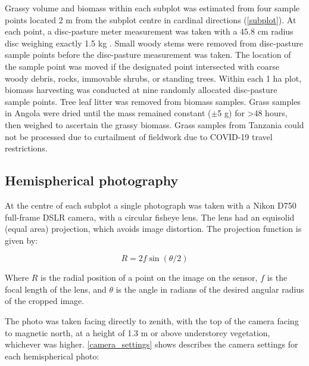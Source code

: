 \documentclass[11pt,a4paper]{article}
\begin{document}
Grassy volume and biomass within each subplot was estimated from four sample points located 2 m from the subplot centre in cardinal directions (\autoref{subplot}). At each point, a disc-pasture meter measurement was taken with a 45.8 cm radius disc weighing exactly 1.5 kg \citep{Bransby1977}. Small woody stems were removed from disc-pasture sample points before the disc-pasture measurement was taken. The location of the sample point was moved if the designated point intersected with coarse woody debris, rocks, immovable shrubs, or standing trees. Within each 1 ha plot, biomass harvesting was conducted at nine randomly allocated disc-pasture sample points. Tree leaf litter was removed from biomass samples. Grass samples in Angola were dried until the mass remained constant ($\pm$5 g) for >48 hours, then weighed to ascertain the grassy biomass. Grass samples from Tanzania could not be processed due to curtailment of fieldwork due to COVID-19 travel restrictions. 

\subsection{Hemispherical photography}

At the centre of each subplot a single photograph was taken with a Nikon D750 full-frame DSLR camera, with a circular fisheye lens. The lens had an equisolid (equal area) projection, which avoids image distortion. The projection function is given by: 

\begin{equation}
	R = 2f \sin{(\theta{}/2)}
\end{equation}

Where $R$ is the radial position of a point on the image on the sensor, $f$ is the focal length of the lens, and $\theta{}$ is the angle in radians of the desired angular radius of the cropped image. 

The photo was taken facing directly to zenith, with the top of the camera facing to magnetic north, at a height of 1.3 m or above understorey vegetation, whichever was higher. \autoref{camera_settings} shows describes the camera settings for each hemispherical photo:
\end{document}
